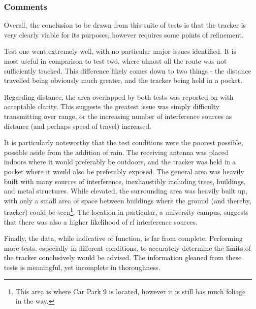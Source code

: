 \subsubsection{Comments}

Overall, the conclusion to be drawn from this suite of tests is that the tracker is very clearly 
viable for its purposes, however requires some points of refinement. 

Test one went extremely well, with no particular major issues identified. It is most useful 
in comparison to test two, where almost all the route was not sufficiently tracked. 
This difference likely comes down to two things - the distance travelled being obviously much greater, 
and the tracker being held in a pocket. 

Regarding distance, the area overlapped by both tests was reported on with acceptable clarity. 
This suggests the greatest issue was simply difficulty transmitting over range, or the increasing
number of interference sources as distance (and perhaps speed of travel) increased. 

It is particularly noteworthy that the test conditions were the poorest possible, possible aside 
from the addition of rain. The receiving antenna was placed indoors where it would preferably
be outdoors, and the tracker was held in a pocket where it would also be preferably exposed. 
The general area was heavily built with many sources of interference, inexhaustibly 
including trees, buildings, and metal structures. While elevated, the surrounding area was heavily built
up, with only a small area of space between buildings where the ground (and thereby, tracker) could be seen\footnote{
    This area is where Car Park 9 is located, however it is still has much foliage in the way. 
}.  
The location in particular, a university campus, suggests that there was also a 
higher likelihood of \acrshort{rf} interference sources.  

Finally, the data, while indicative of function, is far from complete. Performing more tests, especially in different 
conditions, to accurately determine the limits of the tracker conclusively would be advised. 
The information gleaned from these tests is meaningful, yet incomplete in thoroughness. 



